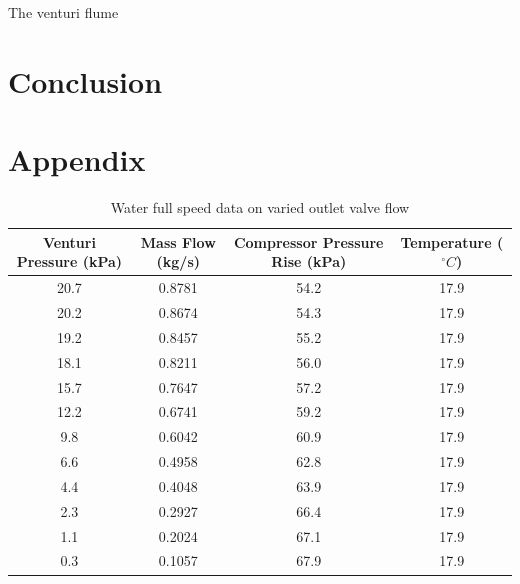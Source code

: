 \documentclass{article}
\begin{document}
The venturi flume 

\section{Conclusion}

\section{Appendix}

\begin{table}[H]
    \centering
    \begin{tabular}{cccc}
        \hline
        Venturi Pressure (kPa) & Mass Flow (kg/s) & Compressor Pressure Rise (kPa) & Temperature ($^\circ C$)\\
        \hline
        20.7 & 0.8781 & 54.2 & 17.9 \\
        20.2 & 0.8674 & 54.3 & 17.9 \\
        19.2 & 0.8457 & 55.2 & 17.9 \\
        18.1 & 0.8211 & 56.0 & 17.9 \\
        15.7 & 0.7647 & 57.2 & 17.9 \\
        12.2 & 0.6741 & 59.2 & 17.9 \\
        9.8 & 0.6042 & 60.9 & 17.9 \\
        6.6 & 0.4958 & 62.8 & 17.9 \\
        4.4 & 0.4048 & 63.9 & 17.9 \\
        2.3 & 0.2927 & 66.4 & 17.9 \\
        1.1 & 0.2024 & 67.1 & 17.9 \\
        0.3 & 0.1057 & 67.9 & 17.9 \\
        \hline
    \end{tabular}
    \caption{Water full speed data on varied outlet valve flow}
    \label{tab:water_full_speed_outlet_data}
\end{table}
\end{document}
